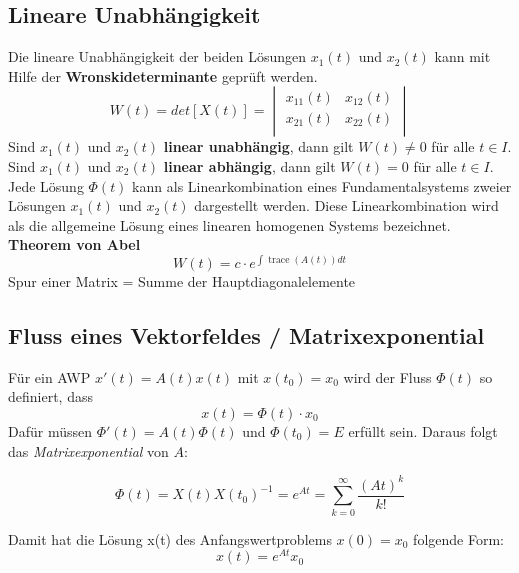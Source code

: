 \subsection{Lineare Unabhängigkeit}
Die lineare Unabhängigkeit der beiden Lösungen $x_1(t)$ und $x_2(t)$ kann mit Hilfe der \textbf{Wronskideterminante} geprüft werden. 
\begin{equation*}
	W(t) = det[X(t)] =    
	\begin{vmatrix} 
	        x_{11}(t) & x_{12}(t)\\ 
	        x_{21}(t) & x_{22}(t)\\   
	\end{vmatrix}
\end{equation*}
Sind $x_1(t)$ und $x_2(t)$ \textbf{linear unabhängig}, dann gilt $W(t) \neq 0$ für alle $t \in I$. \\
Sind $x_1(t)$ und $x_2(t)$ \textbf{linear abhängig}, dann gilt $W(t) = 0$ für alle $t \in I$. \\
Jede Lösung $\Phi(t)$ kann als Linearkombination eines Fundamentalsystems zweier Lösungen $x_1(t)$ und $x_2(t)$ dargestellt werden. Diese Linearkombination wird als die allgemeine Lösung eines linearen homogenen Systems bezeichnet. \\
\textbf{Theorem von Abel}\\
\begin{equation*}
W(t) = c\cdot e^{\int{\operatorname{trace}(A(t))dt}}
\end{equation*}
Spur einer Matrix = Summe der Hauptdiagonalelemente

\subsection{Fluss eines Vektorfeldes / Matrixexponential}
Für ein AWP $x'(t) = A(t) x(t)$ mit $x(t_0)=x_0$ wird der Fluss $\Phi(t)$ so definiert, dass 
\[ x(t) = \Phi(t) \cdot x_0 \]
Dafür müssen $\Phi'(t) = A(t)\Phi(t)$ und $\Phi(t_0) = E$ erfüllt sein.
Daraus folgt das \emph{Matrixexponential} von $A$:

\[
    \Phi(t) = X(t)X(t_0)^{-1} = e^{At} = \sum\limits_{k=0}^{\infty}\frac{(At)^k}{k!}
\]

Damit hat die Lösung x(t) des Anfangswertproblems $x(0) = x_0$ folgende Form: 
\[
    x(t) = e^{At}x_0
\]


